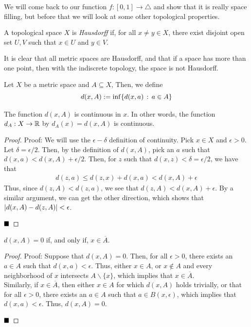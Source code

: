 
We will come back to our function $f : [0, 1] \to \triangle$ and show that it is really space filling, but before that we will look at some other topological properties.

\begin{definition}
    A topological space $X$ is \emph{Hausdorff} if, for all $x \ne y \in X$, there exist disjoint open set $U, V$ such that $x \in U$ and $y \in V$.
\end{definition}

It is clear that all metric spaces are Hausdorff, and that if a space has more than one point, then with the indiscrete topology, the space is not Hausdorff.\\

\begin{definition}
    Let $X$ be a metric space and $A \subseteq X$, Then, we define 
    \[ d(x, A) := \inf\{d(x, a) \, :\, a \in A\} \]
\end{definition}

\begin{lemma}
    The function $d(x, A)$ is continuous in $x$. In other words, the function $d_{A} : X \to \mathbb{R}$ by $d_{A}(x) = d(x, A)$ is continuous.
\end{lemma}
\begin{proof}{Proof:}
    We will use the $\epsilon-\delta$ definition of continuity. Pick $x \in X$ and $\epsilon > 0$. Let $\delta = \epsilon/2$. Then, by the definition of $d(x, A)$, pick an $a$ such that $d(x, a) < d(x, A) + \epsilon/2$. Then, for $z$ such that $d(x, z) < \delta = \epsilon/2$, we have that
    \begin{align*}
        d(z, a) \leq d(z, x) + d(x, a) < d(x, A) + \epsilon 
    \end{align*}
    Thus, since $d(z, A) < d(z, a)$, we see that $d(z, A) < d(x, A) + \epsilon$. By a similar argument, we can get the other direction, which shows that $\left\lvert {d(x, A) - d(z, A)} \right\rvert < \epsilon$. 

    $\qed$
\end{proof}

\begin{lemma}
    $d(x, A) = 0$ if, and only if, $x \in \overline{A}$. 
\end{lemma}
\begin{proof}{Proof:}
    Suppose that $d(x, A) = 0$. Then, for all $\epsilon > 0$, there exists an $a \in A$ such that $d(x, a) < \epsilon$. Thus, either $x \in A$, or $x \notin A$ and every neighborhood of $x$ intersects $A \backslash \{x\}$, which implies that $x \in \overline{A}$.\\

    Similarly, if $x \in \overline{A}$, then either $x \in A$ for which $d(x, A)$ holds trivially, or that for all $\epsilon > 0$, there exists an $a \in A$ such that $a \in B(x, \epsilon)$, which implies that $d(x, a) < \epsilon$. Thus, $d(x, A) = 0$. 

    $\qed$
\end{proof}

